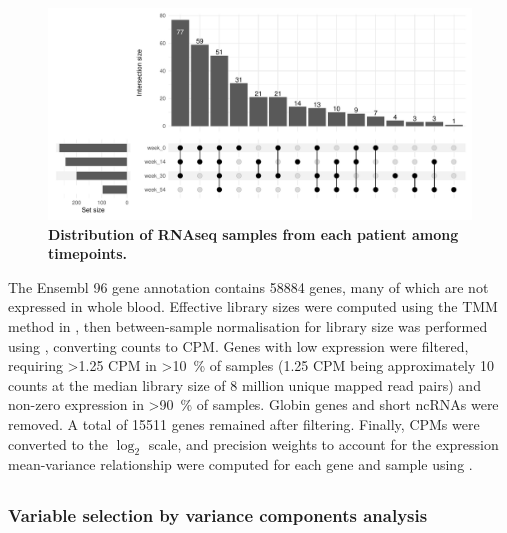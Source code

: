 \begin{figure}
    \centering
    \includegraphics[width=1.0\textwidth,page=1]{mainmatter/figures/chapter_04/process_pheno.pheno_filtered_dge.Visit_Label_upset.pdf}
    \caption{
        \textbf{Distribution of \gls{RNAseq} samples from each patient among timepoints.}
    }
    \label{fig:multipants_visits_upset}
\end{figure}

The Ensembl 96 gene annotation contains \num{58884} genes, many of which are not expressed in whole blood.
Effective library sizes were computed using the \gls{TMM} method in  \autocite{robinson2010EdgeRBioconductorPackage},
then between-sample normalisation for library size was performed using , converting counts to \gls{CPM}.
Genes with low expression were filtered,
requiring \num{>1.25} \gls{CPM} in \SI{>10}{\percent} of samples (1.25 \gls{CPM} being approximately 10 counts at the median library size of 8 million unique mapped read pairs)
and non-zero expression in \SI{>90}{\percent} of samples.
Globin genes and short \glspl{ncRNA} were removed.
A total of \num{15511} genes remained after filtering.
Finally, \glspl{CPM} were converted to the $\log_{2}$ scale, and precision weights to account for the expression mean-variance relationship were computed for each gene and sample using  \autocite{hoffman2016VariancePartitionInterpretingDrivers}.

\subsection{}

\subsubsection{Variable selection by variance components analysis}
\label{subsubsec:multiPANTS_var_selection}


